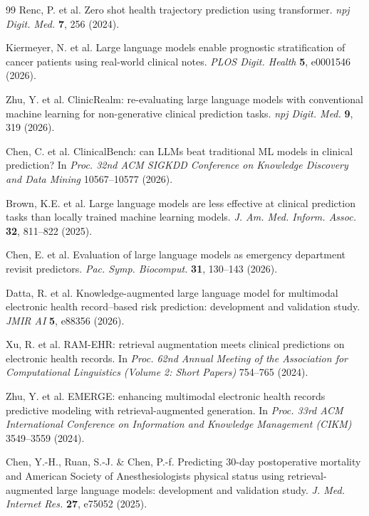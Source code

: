 \documentclass[pdflatex,sn-nature]{sn-jnl}
\begin{document}
\begin{thebibliography}{99}
Renc, P. et al.
Zero shot health trajectory prediction using transformer.
\textit{npj Digit. Med.} \textbf{7}, 256 (2024).

Kiermeyer, N. et al.
Large language models enable prognostic stratification of cancer
patients using real-world clinical notes.
\textit{PLOS Digit. Health} \textbf{5}, e0001546 (2026).

Zhu, Y. et al.
ClinicRealm: re-evaluating large language models with conventional
machine learning for non-generative clinical prediction tasks.
\textit{npj Digit. Med.} \textbf{9}, 319 (2026).

Chen, C. et al.
ClinicalBench: can LLMs beat traditional ML models in clinical
prediction?
In \textit{Proc. 32nd ACM SIGKDD Conference on Knowledge Discovery and
Data Mining} 10567--10577 (2026).

Brown, K.E. et al.
Large language models are less effective at clinical prediction tasks
than locally trained machine learning models.
\textit{J. Am. Med. Inform. Assoc.} \textbf{32}, 811--822 (2025).

Chen, E. et al.
Evaluation of large language models as emergency department revisit
predictors.
\textit{Pac. Symp. Biocomput.} \textbf{31}, 130--143 (2026).

Datta, R. et al.
Knowledge-augmented large language model for multimodal electronic
health record--based risk prediction: development and validation study.
\textit{JMIR AI} \textbf{5}, e88356 (2026).

Xu, R. et al.
RAM-EHR: retrieval augmentation meets clinical predictions on
electronic health records.
In \textit{Proc. 62nd Annual Meeting of the Association for
Computational Linguistics (Volume 2: Short Papers)} 754--765 (2024).

Zhu, Y. et al.
EMERGE: enhancing multimodal electronic health records predictive
modeling with retrieval-augmented generation.
In \textit{Proc. 33rd ACM International Conference on Information and
Knowledge Management (CIKM)} 3549--3559 (2024).

Chen, Y.-H., Ruan, S.-J. \& Chen, P.-f.
Predicting 30-day postoperative mortality and American Society of
Anesthesiologists physical status using retrieval-augmented large
language models: development and validation study.
\textit{J. Med. Internet Res.} \textbf{27}, e75052 (2025).


\end{thebibliography}
\end{document}
